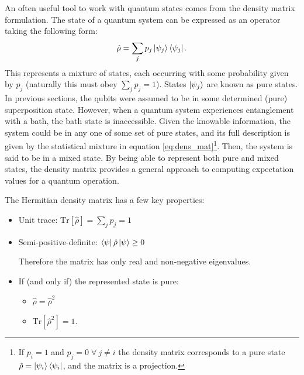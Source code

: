 An often useful tool to work with quantum states comes from the density matrix formulation. The state of a quantum system can be expressed as an operator taking the following form:
\begin{equation}
    \Hat{\rho} = \sum_j p_j \ket{\psi_j}\bra{\psi_j}.
    \label{eq:dens_mat}
\end{equation}
This represents a mixture of states, each occurring with some probability given by $p_j$ (naturally this must obey $\sum_j p_j = 1$). States $\ket{\psi_j}$ are known as pure states. In previous sections, the qubits were assumed to be in some determined (pure) superposition state. However, when a quantum system experiences entanglement with a bath, the bath state is inaccessible. Given the knowable information, the system could be in any one of some set of pure states, and its full description is given by the statistical mixture in equation \ref{eq:dens_mat}\footnote{If $p_i=1$ and $p_j=0 \;\forall\ j \neq i$ the density matrix corresponds to a pure state $\Hat{\rho} = \ket{\psi_i}\bra{\psi_i}$, and the matrix is a projection.}. Then, the system is said to be in a mixed state. By being able to represent both pure and mixed states, the density matrix provides a general approach to computing expectation values for a quantum operation. 

The Hermitian density matrix has a few key properties: 
\begin{itemize}
    \item Unit trace: $\mathrm{Tr}\left[\hat{\rho}\right] =\sum_j p_j = 1 $
    \item Semi-positive-definite: $\bra{\psi}\hat\rho\ket{\psi}\geq 0$
    
    Therefore the matrix has only real and non-negative eigenvalues.
    \item If (and only if) the represented state is pure:
    \begin{itemize}
        \item $\hat\rho=\hat\rho^2$
        \item $\mathrm{Tr}\left[\hat\rho^2\right] = 1$.
    \end{itemize}
\end{itemize}

